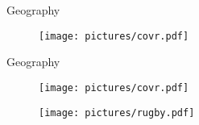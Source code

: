 \documentclass{beamer}
\begin{document}


\begin{frame}{Geography}
  \begin{figure}
  
     \begin{center}
	 \texttt{[image: pictures/covr.pdf]}
	 
  
    \end{center}

    
  \end{figure}

\end{frame}

\begin{frame}{Geography}
  \begin{figure}
  
  \begin{minipage}[b]{0.8\linewidth}
     \begin{center}
	 \texttt{[image: pictures/covr.pdf]}
	 
  
    \end{center}

    
  \end{minipage} 
  \end{figure}
  
  \begin{figure}
  \begin{minipage}[b]{0.5\linewidth}
     \begin{center}
	 \texttt{[image: pictures/rugby.pdf]}
  
    \end{center}

    
  \end{minipage}
   \end{figure}

  \end{frame}
 
\end{document}
